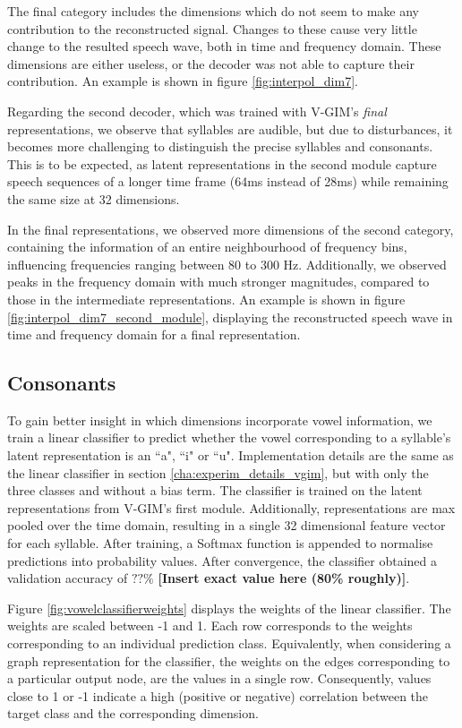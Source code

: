 		The final category includes the dimensions which do not seem to make any contribution to the reconstructed signal. Changes to these cause very little change to the resulted speech wave, both in time and frequency domain. These dimensions are either useless, or the decoder was not able to capture their contribution. An example is shown in figure \ref{fig:interpol_dim7}.
		
		Regarding the second decoder, which was trained with V-GIM's \textit{final} representations, we observe that syllables are audible, but due to disturbances, it becomes more challenging to distinguish the precise syllables and consonants. This is to be expected, as latent representations in the second module capture speech sequences of a longer time frame (64ms instead of 28ms) while remaining the same size at 32 dimensions.
		
		In the final representations, we observed more dimensions of the second category, containing the information of an entire neighbourhood of frequency bins, influencing frequencies ranging between 80 to 300 Hz. Additionally, we observed peaks in the frequency domain with much stronger magnitudes, compared to those in the intermediate representations. An example is shown in figure \ref{fig:interpol_dim7_second_module}, displaying the reconstructed speech wave in time and frequency domain for a final representation.
		
		
	
	\subsection{Consonants}
		To gain better insight in which dimensions incorporate vowel information, we train a linear classifier to predict whether the vowel corresponding to a syllable's latent representation is an ``a", ``i" or ``u". Implementation details are the same as the linear classifier in section \ref{cha:experim_details_vgim}, but with only the three classes and without a bias term. The classifier is trained on the latent representations from V-GIM's first module. Additionally, representations are max pooled over the time domain, resulting in a single 32 dimensional feature vector for each syllable. After training, a Softmax function is appended to normalise predictions into probability values. After convergence, the classifier obtained a validation accuracy of $??\%$ \textbf{[Insert exact value here (80\% roughly)]}.
		
		Figure \ref{fig:vowelclassifierweights} displays the weights of the linear classifier. The weights are scaled between -1 and 1. Each row corresponds to the weights corresponding to an individual prediction class. Equivalently, when considering a graph representation for the classifier, the weights on the edges corresponding to a particular output node, are the values in a single row. Consequently, values close to 1 or -1 indicate a high (positive or negative) correlation between the target class and the corresponding dimension. 
		
